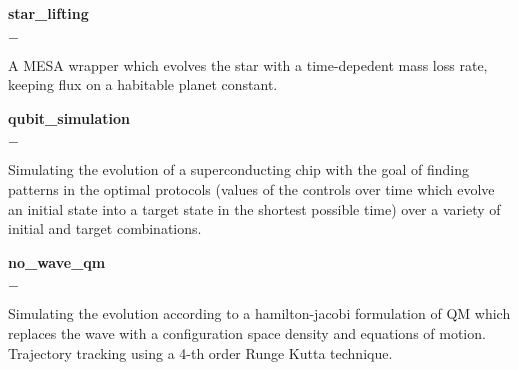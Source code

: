 \documentclass[]{scoggins-cv} %
\begin{document}
\begin{entrylist}

    \entry
    {\textbf{star\_lifting}}
    {}
    {}
    {%
        \vspace{-1em}
        \begin{list}{{\color{numcolor}$-$}}{\cvlist}
            \item A MESA wrapper which evolves the star with a time-depedent mass loss rate, keeping flux on a habitable planet constant.
        \end{list}
    }

    \entry
    {\textbf{qubit\_simulation}}
    {}
    {}
    {%
        \vspace{-1em}
        \begin{list}{{\color{numcolor}$-$}}{\cvlist}
            \item Simulating the evolution of a superconducting chip with the goal of finding patterns in the optimal protocols (values of the controls over time which evolve an initial state into a target state in the shortest possible time) over a variety of initial and target combinations.
        \end{list}
    }


    \entry
    {\textbf{no\_wave\_qm}}
    {}
    {}
    {%
        \vspace{-1em}
        \begin{list}{{\color{numcolor}$-$}}{\cvlist}
            \item Simulating the evolution according to a hamilton-jacobi formulation of QM which replaces the wave with a configuration space density and equations of motion. Trajectory tracking using a 4-th order Runge Kutta technique.
        \end{list}
    }



\end{entrylist}
\vspace{-0.5cm}
\end{document}
